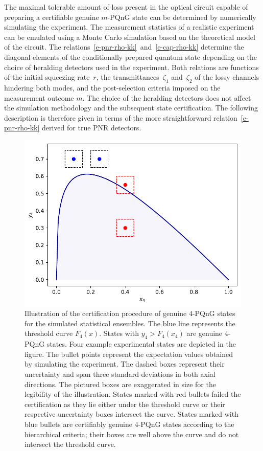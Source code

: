 \documentclass{article}
\begin{document}
The maximal tolerable amount of loss present in the optical circuit capable of preparing a certifiable genuine $m$-PQnG state can be determined by numerically simulating the experiment. The measurement statistics of a realistic experiment can be emulated using a Monte Carlo simulation based on the theoretical model of the circuit. The relations~\eqref{e-pnr-rho-kk}~and~\eqref{e-cap-rho-kk} determine the diagonal elements of the conditionally prepared quantum state depending on the choice of heralding detectors used in the experiment. Both relations are functions of the initial squeezing rate~$r$, the transmittances~$\zeta_{1}$ and~$\zeta_{2}$ of the lossy channels hindering both modes, and the post-selection criteria imposed on the measurement outcome $m$. The choice of the heralding detectors does not affect the simulation methodology and the subsequent state certification. The following description is therefore given in terms of the more straightforward relation~\eqref{e-pnr-rho-kk} derived for true PNR detectors.

\begin{figure}[h]
  \begin{center}
    \includegraphics[width = 0.50 \columnwidth]{import/illustrate_lachman_curve.pdf}
  \end{center}
  \caption{
    Illustration of the certification procedure of genuine $4$-PQnG states for the simulated statistical ensembles. The blue line represents the threshold curve $F_{4} (x)$. States with $y_{4} > F_{4}(x_{4})$ are genuine $4$-PQnG states. Four example experimental states are depicted in the figure. The bullet points represent the expectation values obtained by simulating the experiment. The dashed boxes represent their uncertainty and span three standard deviations in both axial directions. The pictured boxes are exaggerated in size for the legibility of the illustration. States marked with red bullets failed the certification as they lie either under the threshold curve or their respective uncertainty boxes intersect the curve. States marked with blue bullets are certifiably genuine $4$-PQnG states according to the hierarchical criteria; their boxes are well above the curve and do not intersect the threshold curve.
  }
  \label{f-otm-il}
\end{figure}
\end{document}
